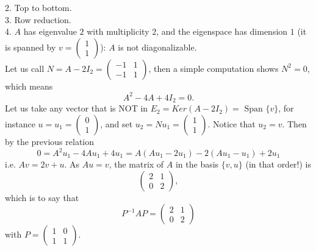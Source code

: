 2. Top to bottom.\\

3. Row reduction.\\

4. $A$ has eigenvalue $2$ with multiplicity $2$, and the eigenspace has dimension $1$ (it is spanned by $v= \begin{pmatrix} 1 \\ 1 \end{pmatrix}$): $A$ is not diagonalizable.\\

Let us call $N= A -2 I_2 = \begin{pmatrix} -1 & 1 \\ -1 & 1\end{pmatrix}$, then a simple computation shows $N^2 = 0$, which means 
\[A^2 -4 A +4I_2 = 0.\]
Let us take any vector that is NOT in $E_2 = Ker(A-2I_2)= \text{ Span }\{v\}$, for instance $u=u_1 =  \begin{pmatrix} 0 \\ 1 \end{pmatrix}$, and set $u_2 = Nu_1 = \begin{pmatrix} 1 \\ 1 \end{pmatrix}$. Notice that $u_2 = v$. Then by the previous relation 
\[0=A^2 u_1 -4 Au_1 +4u_1 = A(Au_1 - 2u_1) -2(A u_1 - u_1) +2u_1 \]
i.e. $A v = 2v + u$. As $Au=v$, the matrix of $A$ in the basis $\{v,u\}$ (in that order!) is 
\[\begin{pmatrix} 2 & 1 \\ 0 & 2 \end{pmatrix},\]
which is to say that
\[P^{-1}AP  = \begin{pmatrix} 2 & 1 \\ 0 & 2 \end{pmatrix}\]
with $P = \begin{pmatrix} 1 & 0 \\ 1 & 1 \end{pmatrix}$.\\


